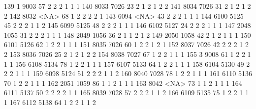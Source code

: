 \documentclass[
  letterpaper,
  DIV=11,
  numbers=noendperiod]{scrreprt}
\newenvironment{Shaded}{\begin{snugshade}}{\end{snugshade}}
\newcommand{\NormalTok}[1]{\textcolor[rgb]{0.00,0.23,0.31}{#1}}
\begin{document}
\begin{Shaded}
\begin{Highlighting}[]
\NormalTok{139    1 9003  57          2      2        2         1    1                 1}
\NormalTok{140 8033 7026  23          2      1        2         1    2                 2}
\NormalTok{141 8034 7026  31          2      1        2         1    2                 2}
\NormalTok{142 8032 \textless{}NA\textgreater{}  68          1      2        2         2    2                 1}
\NormalTok{143 6094 \textless{}NA\textgreater{}  43          2      2        2         1    1                 1}
\NormalTok{144 6100 5125  45          2      2        2         1    1                 2}
\NormalTok{145 6099 5125  48          2      2        2         1    1                 1}
\NormalTok{146 6102 5127  24          2      2        2         1    1                 1}
\NormalTok{147 2048 1055  31          2      2        2         1    1                 1}
\NormalTok{148 2049 1056  36          2      1        1         2    1                 2}
\NormalTok{149 2050 1058  42          2      1        2         1    1                 1}
\NormalTok{150 6101 5126  62          1      2        2         1    1                 1}
\NormalTok{151 8035 7026  60          1      2        2         1    2                 1}
\NormalTok{152 8037 7026  42          2      2        2         1    2                 2}
\NormalTok{153 8036 7026  25          2      1        2         1    2                 2}
\NormalTok{154 8038 7027  67          1      2        2         1    1                 1}
\NormalTok{155    3 9008  61          1      2        2         1    1                 1}
\NormalTok{156 6108 5134  78          1      2        2         1    1                 1}
\NormalTok{157 6107 5133  64          1      2        2         1    1                 1}
\NormalTok{158 6104 5130  49          2      2        2         1    1                 1}
\NormalTok{159 6098 5124  51          2      2        2         1    1                 2}
\NormalTok{160 8040 7028  78          1      2        2         1    1                 1}
\NormalTok{161 6110 5136  70          1      2        2         1    1                 1}
\NormalTok{162 2051 1059  86          1      1        2         1    1                 1}
\NormalTok{163 8042 \textless{}NA\textgreater{}  73          1      1        2         1    1                 1}
\NormalTok{164 6111 5137  50          2      2        2         2    1                 1}
\NormalTok{165 8039 7028  57          2      2        2         1    1                 2}
\NormalTok{166 6109 5135  75          1      2        2         1    1                 1}
\NormalTok{167 6112 5138  64          1      2        2         1    1                 2}

\end{Highlighting}
\end{Shaded}
\end{document}
